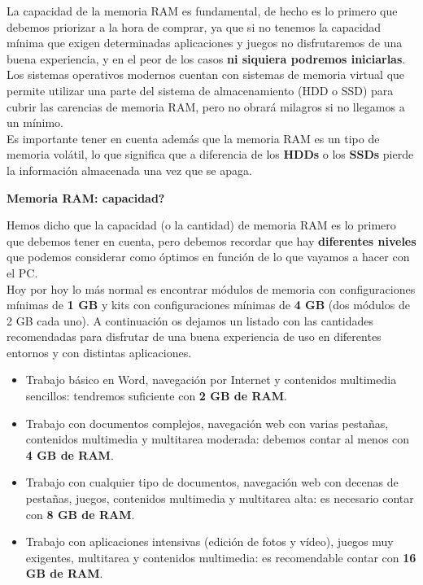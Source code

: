 \documentclass[10pt,letterpaper]{article}
\begin{document}
\begin{justify}
	\noindent
	La capacidad de la memoria RAM es fundamental, de hecho es lo primero que debemos priorizar a la hora de comprar, ya que si no tenemos la capacidad mínima que exigen determinadas aplicaciones y juegos no disfrutaremos de una buena experiencia, y en el peor de los casos \textbf{ni siquiera podremos iniciarlas}.\\ 
	
	\noindent
	Los sistemas operativos modernos cuentan con sistemas de memoria virtual que permite utilizar una parte del sistema de almacenamiento (HDD o SSD) para cubrir las carencias de memoria RAM, pero no obrará milagros si no llegamos a un mínimo.\\
	
	\noindent
	Es importante tener en cuenta además que la memoria RAM es un tipo de memoria volátil, lo que significa que a diferencia de los \textbf{HDDs} o los \textbf{SSDs} pierde la información almacenada una vez que se apaga.
	
	
	\begin{flushleft}
		\textbf{Memoria RAM: capacidad?}	
		\end{flushleft}
		
		\noindent
		Hemos dicho que la capacidad (o la cantidad) de memoria RAM es lo primero que debemos tener en cuenta, pero debemos recordar que hay \textbf{diferentes niveles} que podemos considerar como óptimos en función de lo que vayamos a hacer con el PC.\\
		
		\noindent
		Hoy por hoy lo más normal es encontrar módulos de memoria con configuraciones mínimas de \textbf{1 GB} y kits con configuraciones mínimas de \textbf{4 GB} (dos módulos de 2 GB cada uno). A continuación os dejamos un listado con las cantidades recomendadas para disfrutar de una buena experiencia de uso en diferentes entornos y con distintas aplicaciones.\\
				
		\begin{itemize}
			\item Trabajo básico en Word, navegación por Internet y contenidos multimedia sencillos: tendremos suficiente con \textbf{2 GB de RAM}.
			\item Trabajo con documentos complejos, navegación web con varias pestañas, contenidos multimedia y multitarea moderada: debemos contar al menos con \textbf{4 GB de RAM}.
			\item Trabajo con cualquier tipo de documentos, navegación web con decenas de pestañas, juegos, contenidos multimedia y multitarea alta: es necesario contar con \textbf{8 GB de RAM}.
			\item Trabajo con aplicaciones intensivas (edición de fotos y vídeo), juegos muy exigentes, multitarea y contenidos multimedia: es recomendable contar con \textbf{16 GB de RAM}.
			

\end{itemize}
\end{justify}
\end{document}
